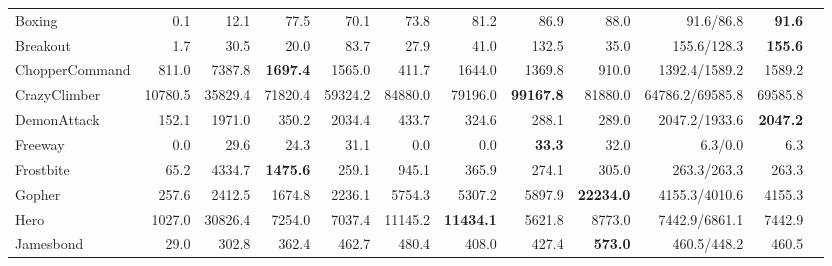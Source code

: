 \documentclass{article}
\begin{document}
\begin{table}[t]
\begin{tabular}{
        l                                %
        rrrrrrrrrrr                   %
    }
Boxing                 &  0.1       &  12.1      &  77.5               &  70.1      &  73.8        &  81.2               &  86.9               &  88.0               &  \textcolor{pastelgreen}{91.6}/86.8        &  \textbf{91.6}      \\
Breakout               &  1.7       &  30.5      &  20.0               &  83.7      &  27.9        &  41.0               &  132.5              &  35.0               &  \textcolor{pastelgreen}{155.6}/128.3      &  \textbf{155.6}     \\
ChopperCommand         &  811.0     &  7387.8    &  \textbf{1697.4}    &  1565.0    &  411.7       &  1644.0             &  1369.8             &  910.0              &  1392.4/\textcolor{pastelgreen}{1589.2}    &  1589.2             \\
CrazyClimber           &  10780.5   &  35829.4   &  71820.4            &  59324.2   &  84880.0     &  79196.0            &  \textbf{99167.8}   &  81880.0            &  64786.2/\textcolor{pastelgreen}{69585.8}  &  69585.8            \\
DemonAttack            &  152.1     &  1971.0    &  350.2              &  2034.4    &  433.7       &  324.6              &  288.1              &  289.0              &  \textcolor{pastelgreen}{2047.2}/1933.6    &  \textbf{2047.2}    \\
Freeway                &  0.0       &  29.6      &  24.3               &  31.1      &  0.0         &  0.0                &  \textbf{33.3}      &  32.0               &  \textcolor{pastelgreen}{6.3}/0.0          &  6.3                \\
Frostbite              &  65.2      &  4334.7    &  \textbf{1475.6}    &  259.1     &  945.1       &  365.9              &  274.1              &  305.0              &  263.3/\textcolor{pastelgreen}{263.3}      &  263.3              \\
Gopher                 &  257.6     &  2412.5    &  1674.8             &  2236.1    &  5754.3      &  5307.2             &  5897.9             &  \textbf{22234.0}   &  \textcolor{pastelgreen}{4155.3}/4010.6    &  4155.3             \\
Hero                   &  1027.0    &  30826.4   &  7254.0             &  7037.4    &  11145.2     &  \textbf{11434.1}   &  5621.8             &  8773.0             &  \textcolor{pastelgreen}{7442.9}/6861.1    &  7442.9             \\
Jamesbond              &  29.0      &  302.8     &  362.4              &  462.7     &  480.4       &  408.0              &  427.4              &  \textbf{573.0}     &  \textcolor{pastelgreen}{460.5}/448.2      &  460.5              \\

\end{tabular}
\end{table}
\end{document}
